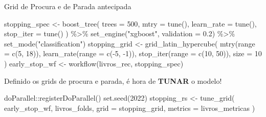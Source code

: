 \documentclass[
  9 pt,
  ignorenonframetext,
]{beamer}
\newenvironment{Shaded}{\begin{snugshade}}{\end{snugshade}}
\newcommand{\AttributeTok}[1]{\textcolor[rgb]{0.77,0.63,0.00}{#1}}
\newcommand{\DecValTok}[1]{\textcolor[rgb]{0.00,0.00,0.81}{#1}}
\newcommand{\FloatTok}[1]{\textcolor[rgb]{0.00,0.00,0.81}{#1}}
\newcommand{\FunctionTok}[1]{\textcolor[rgb]{0.00,0.00,0.00}{#1}}
\newcommand{\NormalTok}[1]{#1}
\newcommand{\OtherTok}[1]{\textcolor[rgb]{0.56,0.35,0.01}{#1}}
\newcommand{\SpecialCharTok}[1]{\textcolor[rgb]{0.00,0.00,0.00}{#1}}
\newcommand{\StringTok}[1]{\textcolor[rgb]{0.31,0.60,0.02}{#1}}
\begin{document}
\begin{frame}[fragile]{Grid de Procura e de Parada antecipada}
\begin{Shaded}
\begin{Highlighting}[]
\NormalTok{stopping\_spec }\OtherTok{\textless{}{-}}
  \FunctionTok{boost\_tree}\NormalTok{(}
    \AttributeTok{trees =} \DecValTok{500}\NormalTok{,}
    \AttributeTok{mtry =} \FunctionTok{tune}\NormalTok{(),}
    \AttributeTok{learn\_rate =} \FunctionTok{tune}\NormalTok{(),}
    \AttributeTok{stop\_iter =} \FunctionTok{tune}\NormalTok{()}
\NormalTok{  ) }\SpecialCharTok{\%\textgreater{}\%}
  \FunctionTok{set\_engine}\NormalTok{(}\StringTok{"xgboost"}\NormalTok{, }\AttributeTok{validation =} \FloatTok{0.2}\NormalTok{) }\SpecialCharTok{\%\textgreater{}\%}
  \FunctionTok{set\_mode}\NormalTok{(}\StringTok{"classification"}\NormalTok{)}
\NormalTok{stopping\_grid }\OtherTok{\textless{}{-}}
  \FunctionTok{grid\_latin\_hypercube}\NormalTok{(}
    \FunctionTok{mtry}\NormalTok{(}\AttributeTok{range =} \FunctionTok{c}\NormalTok{(}\DecValTok{5}\NormalTok{, }\DecValTok{18}\NormalTok{)),}
    \FunctionTok{learn\_rate}\NormalTok{(}\AttributeTok{range =} \FunctionTok{c}\NormalTok{(}\SpecialCharTok{{-}}\DecValTok{5}\NormalTok{, }\SpecialCharTok{{-}}\DecValTok{1}\NormalTok{)), }
    \FunctionTok{stop\_iter}\NormalTok{(}\AttributeTok{range =} \FunctionTok{c}\NormalTok{(}\DecValTok{10}\NormalTok{, }\DecValTok{50}\NormalTok{)), }
    \AttributeTok{size =} \DecValTok{10}
\NormalTok{  )}
\NormalTok{early\_stop\_wf }\OtherTok{\textless{}{-}} \FunctionTok{workflow}\NormalTok{(livros\_rec, stopping\_spec)}
\end{Highlighting}
\end{Shaded}
\end{frame}

\begin{frame}[fragile]{Definido os grids de procura e parada, é hora de
\textbf{TUNAR} o modelo!}
\protect\hypertarget{definido-os-grids-de-procura-e-parada-uxe9-hora-de-tunar-o-modelo}{}
\begin{Shaded}
\begin{Highlighting}[]
\NormalTok{doParallel}\SpecialCharTok{::}\FunctionTok{registerDoParallel}\NormalTok{()}
\FunctionTok{set.seed}\NormalTok{(}\DecValTok{2022}\NormalTok{)}
\NormalTok{stopping\_rs }\OtherTok{\textless{}{-}} \FunctionTok{tune\_grid}\NormalTok{(}
\NormalTok{  early\_stop\_wf,}
\NormalTok{  livros\_folds,}
  \AttributeTok{grid =}\NormalTok{ stopping\_grid,}
  \AttributeTok{metrics =}\NormalTok{ livros\_metricas}
\NormalTok{)}
\end{Highlighting}
\end{Shaded}
\end{frame}
\end{document}
